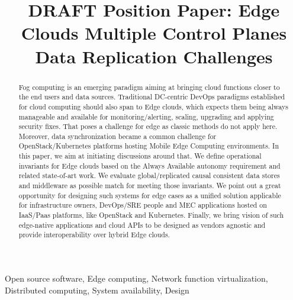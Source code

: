 \documentclass[conference]{IEEEtran}
\begin{document}
\title{DRAFT Position Paper: Edge Clouds Multiple Control Planes Data Replication
Challenges\\
}

\author{
\IEEEauthorblockA{\textit{} \\
\textit{}\\
\\
}
}

\maketitle

\begin{abstract}
Fog computing is an emerging paradigm aiming at bringing cloud functions closer
to the end users and data sources. Traditional DC-centric DevOps paradigms
established for cloud computing should also span to Edge clouds, which
expects them being always manageable and available for monitoring/alerting,
scaling, upgrading and applying security fixes. That poses a challenge for edge
as classic methods do not apply here. Moreover, data synchronization became a
common challenge for OpenStack/Kubernetes platforms hosting Mobile Edge
Computing environments. In this paper, we aim at initiating discussions around
that. We define operational invariants for Edge clouds based on the Always
Available autonomy requirement and related state-of-art work. We evaluate
global/replicated causal consistent data stores and middleware as possible
match for meeting those invariants. We point out a great opportunity for
designing such systems for edge cases as a unified solution applicable for
infrastructure owners, DevOps/SRE people and MEC applications hosted on
IaaS/Paas platforms, like OpenStack and Kubernetes. Finally, we bring vision
of such edge-native applications and cloud APIs to be designed as vendors
agnostic and provide interoperability over hybrid Edge clouds.
\end{abstract}

\begin{IEEEkeywords}
Open source software, Edge computing, Network function virtualization,
Distributed computing, System availability, Design
\end{IEEEkeywords}
\end{document}
